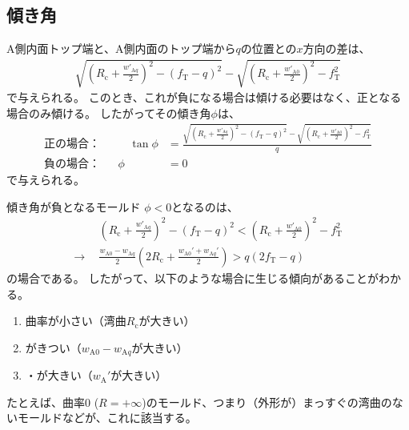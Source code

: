 \subsection{傾き角}
A側内面トップ端と、A側内面のトップ端から$q$の位置との$x$方向の差は、
\begin{align*}
  \sqrt{\left(R_\mathrm c+\frac{w'_{\mathrm Aq}}2\right)^2-(f_\mathrm T-q)^2}
  -\sqrt{\left(R_\mathrm c+\frac{w'_{\mathrm A0}}2\right)^2-f_\mathrm T^2}
\end{align*}
で与えられる。
このとき、これが負になる場合は傾ける必要はなく、正となる場合のみ傾ける。
したがってその傾き角$\phi$は、
\begin{subequations}
\label{eq:dKatamuki}
\begin{alignat}{2}
  \text{正の場合：}&&\quad
  \tan\phi
  &= \frac{\displaystyle
           \sqrt{\left(R_\mathrm c+\frac{w'_{\mathrm Aq}}2\right)^2-(f_\mathrm T-q)^2}
           -\sqrt{\left(R_\mathrm c+\frac{w'_{\mathrm A0}}2\right)^2-f_\mathrm T^2}}q\\[8pt]
  \text{負の場合：}&&
  \phi
  &= 0
\end{alignat}
\end{subequations}
で与えられる。
\begin{\Columnname}{傾き角が負となるモールド}
$\phi < 0$となるのは、
\begin{align*}
  & \left(R_\mathrm c+\frac{w'_{\mathrm Aq}}2\right)^2-(f_\mathrm T-q)^2
    < \left(R_\mathrm c+\frac{w'_{\mathrm A0}}2\right)^2-f_\mathrm T^2\\
  \longrightarrow~~
  & \frac{w_{\mathrm A0}-w_{\mathrm Aq}}2
    \left(2R_\mathrm c+\frac{w_{\mathrm A0}'+w_{\mathrm Aq}'}2\right)
    > q(2f_\mathrm T-q)
\end{align*}
の場合である。
したがって、以下のような場合に生じる傾向があることがわかる。
\begin{enumerate}
\item {}曲率が小さい（湾曲$R_\mathrm c$が大きい）
\item \IDTaper がきつい（$w_{\mathrm A0}-w_{\mathrm Aq}$が大きい）
\item \InnerDiameter・\PlatingThk が大きい（$w_\mathrm A'$が大きい）
\end{enumerate}
たとえば、曲率0 ($R = +\infty$)のモールド、つまり（外形が）まっすぐの湾曲のないモールドなどが、これに該当する。
\end{\Columnname}
